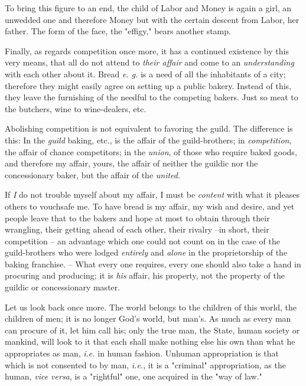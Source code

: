 \documentclass[a4paper]{book}
\begin{document}
To bring this figure to an end, the child of Labor and Money is again a girl, 
an unwedded one and therefore Money but with the certain descent from Labor, 
her father. The form of the face, the "{}effigy,"{} bears another stamp.

Finally, as regards competition once more, it has a continued existence by 
this very means, that all do not attend to \textit{their affair} and come to 
an \textit{understanding} with each other about it. Bread \textit{e. g.} is a 
need of all the inhabitants of a city; therefore they might easily agree on 
setting up a public bakery. Instead of this, they leave the furnishing of the 
needful to the competing bakers. Just so meat to the butchers, wine to 
wine-dealers, etc.

Abolishing competition is not equivalent to favoring the guild. The difference 
is this: In the \textit{guild} baking, etc., is the affair of the 
guild-brothers; in \textit{competition}, the affair of chance competitors; in 
the \textit{union}, of those who require baked goods, and therefore my affair, 
yours, the affair of neither the guildic nor the concessionary baker, but the 
affair of the \textit{united}.

If \textit{I} do not trouble myself about my affair, I must be 
\textit{content} with what it pleases others to vouchsafe me. To have bread is 
my affair, my wish and desire, and yet people leave that to the bakers and 
hope at most to obtain through their wrangling, their getting ahead of each 
other, their rivalry --in short, their competition -- an advantage which one 
could not count on in the case of the guild-brothers who were lodged 
\textit{entirely} and \textit{alone} in the proprietorship of the baking 
franchise. -- What every one requires, every one should also take a hand in 
procuring and producing; it is \textit{his} affair, his property, not the 
property of the guildic or concessionary master.

Let us look back once more. The world belongs to the children of this world, 
the children of men; it is no longer God's world, but man's. As much as every 
man can procure of it, let him call his; only the true man, the State, human 
society or mankind, will look to it that each shall make nothing else his own 
than what he appropriates as man, \textit{i.e.} in human fashion. Unhuman 
appropriation is that which is not consented to by man, \textit{i.e.}, it is a 
"{}criminal"{} appropriation, as the human, \textit{vice versa}, is a 
"{}rightful"{} one, one acquired in the "{}way of law."{}
\end{document}
